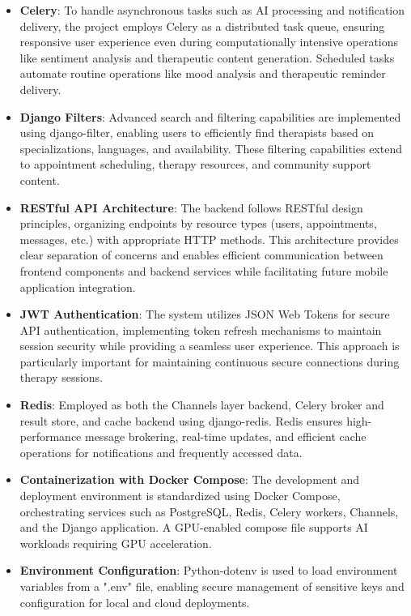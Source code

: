 \begin{itemize}
  \item \textbf{Celery}: To handle asynchronous tasks such as AI processing and notification delivery, the project employs Celery as a distributed task queue, ensuring responsive user experience even during computationally intensive operations like sentiment analysis and therapeutic content generation. Scheduled tasks automate routine operations like mood analysis and therapeutic reminder delivery.
  
  \item \textbf{Django Filters}: Advanced search and filtering capabilities are implemented using django-filter, enabling users to efficiently find therapists based on specializations, languages, and availability. These filtering capabilities extend to appointment scheduling, therapy resources, and community support content.
  
  \item \textbf{RESTful API Architecture}: The backend follows RESTful design principles, organizing endpoints by resource types (users, appointments, messages, etc.) with appropriate HTTP methods. This architecture provides clear separation of concerns and enables efficient communication between frontend components and backend services while facilitating future mobile application integration.
  
  \item \textbf{JWT Authentication}: The system utilizes JSON Web Tokens for secure API authentication, implementing token refresh mechanisms to maintain session security while providing a seamless user experience. This approach is particularly important for maintaining continuous secure connections during therapy sessions.
  
  \item \textbf{Redis}: Employed as both the Channels layer backend, Celery broker and result store, and cache backend using django-redis. Redis ensures high-performance message brokering, real-time updates, and efficient cache operations for notifications and frequently accessed data.
  
  \item \textbf{Containerization with Docker Compose}: The development and deployment environment is standardized using Docker Compose, orchestrating services such as PostgreSQL, Redis, Celery workers, Channels, and the Django application. A GPU-enabled compose file supports AI workloads requiring GPU acceleration.
  
  \item \textbf{Environment Configuration}: Python-dotenv is used to load environment variables from a ".env" file, enabling secure management of sensitive keys and configuration for local and cloud deployments.
  

\end{itemize}
